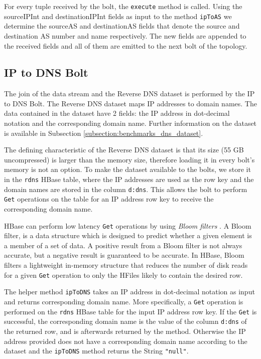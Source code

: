 For every tuple received by the bolt, the \texttt{execute} method is called. Using the sourceIPInt and destinationIPInt fields as input to the method \texttt{ipToAS} we determine the sourceAS and destinationAS fields that denote the source and destination AS number and name respectively. The new fields are appended to the received fields and all of them are emitted to the next bolt of the topology.

\bigskip

\subsection{IP to DNS Bolt}

The join of the data stream and the Reverse DNS dataset is performed by the IP to DNS Bolt. The Reverse DNS dataset maps IP addresses to domain names. The data contained in the dataset have 2 fields: the IP address in dot-decimal notation and the corresponding domain name. Further information on the dataset is available in Subsection \ref{subsection:benchmarks_dns_dataset}.

The defining characteristic of the Reverse DNS dataset is that its size (55 GB uncompressed) is larger than the memory size, therefore loading it in every bolt's memory is not an option. To make the dataset available to the bolts, we store it in the \texttt{rdns} HBase table, where the IP addresses are used as the row key and the domain names are stored in the column \texttt{d:dns}. This allows the bolt to perform \texttt{Get} operations on the table for an IP address row key to receive the corresponding domain name.

HBase can perform low latency \texttt{Get} operations by using \emph{Bloom filters} \cite{bloom}. A Bloom filter, is a data structure which is designed to predict whether a given element is a member of a set of data. A positive result from a Bloom filter is not always accurate, but a negative result is guaranteed to be accurate. In HBase, Bloom filters a lightweight in-memory structure that reduces the number of disk reads for a given \texttt{Get} operation to only the HFiles likely to contain the desired row.

The helper method \texttt{ipToDNS} takes an IP address in dot-decimal notation as input and returns corresponding domain name. More specifically, a \texttt{Get} operation is performed on the \texttt{rdns} HBase table for the input IP address row key. If the \texttt{Get} is successful, the corresponding domain name is the value of the column \texttt{d:dns} of the returned row, and is afterwards returned by the method. Otherwise the IP address provided does not have a corresponding domain name according to the dataset and the \texttt{ipToDNS} method returns the String \texttt{"null"}.

